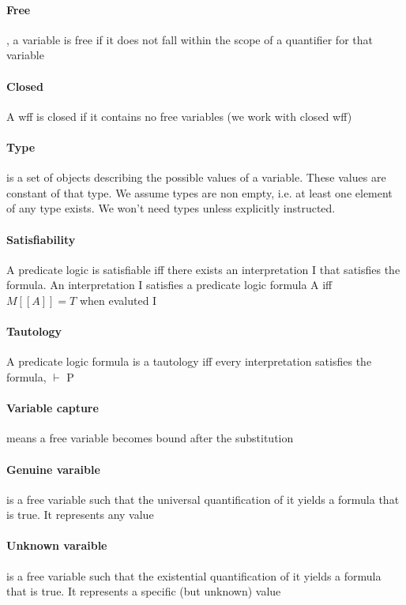\documentclass[12pt]{report}
\begin{document}
    \paragraph{Free}, a variable is free if it does not fall within the scope of
    a quantifier for that variable

    \paragraph{Closed} A wff is closed if it contains no free variables (we
    work with closed wff)

    \paragraph{Type} is a set of objects describing the possible values of a
    variable. These values are constant of that type. We assume types are non
    empty, i.e. at least one element of any type exists. We won't need types
    unless explicitly instructed.

    \paragraph{Satisfiability} A predicate logic is satisfiable iff there
    exists an interpretation I that satisfies the formula. An interpretation I
    satisfies a predicate logic formula A iff $M[[A]] = T$ when evaluted I

    \paragraph{Tautology} A predicate logic formula is a tautology iff every
    interpretation satisfies the formula, $\vdash$ P

    \paragraph{Variable capture} means a free variable becomes bound after the
    substitution

    \paragraph{Genuine varaible} is a free variable such that the universal
    quantification of it yields a formula that is true. It represents any value

    \paragraph{Unknown varaible} is a free variable such that the existential
    quantification of it yields a formula that is true. It represents a
    specific (but unknown) value
\end{document}
